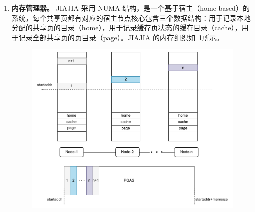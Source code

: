{\begin{enumerate}[label=\arabic*.]
        \item \textbf{内存管理器。} JIAJIA 采用 NUMA 结构，是一个基于宿主（home-based）的系统，每个共享页都有对应的宿主节点核心包含三个数据结构：用于记录本地分配的共享页的目录（home），用于记录缓存页状态的缓存目录（cache），用于记录全部共享页的页目录（page）。JIAJIA 的内存组织如~\ref{fig:JIAJIA-memory}所示。
              \begin{figure}[!htbp]
                  \centering
                  \includegraphics[width=1.0\textwidth]{Img/JIAJIA内存组织.drawio.pdf}
                  \label{fig:JIAJIA-memory}
              \end{figure}


\end{enumerate}}
